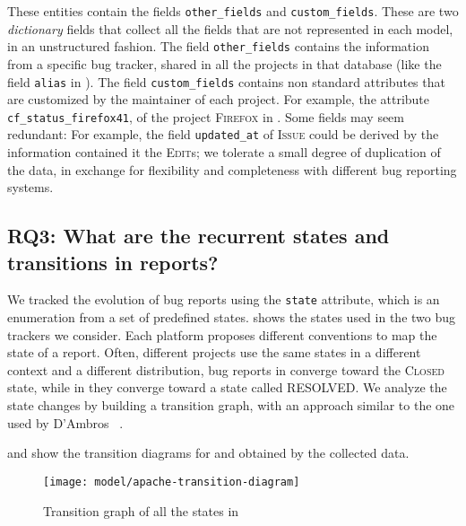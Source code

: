 These entities contain the fields \texttt{other\_fields} and \texttt{custom\_fields}.
These are two \emph{dictionary} fields that collect all the fields that are not represented in each model, in an unstructured fashion.
The field \texttt{other\_fields} contains the information from a specific bug tracker, shared in all the projects in that database (like the field \texttt{alias} in \bzilla).
The field \texttt{custom\_fields} contains non standard attributes that are customized by the maintainer of each project.
For example, the attribute \texttt{cf\_status\_firefox41}, of the project \textsc{Firefox} in \bzilla.
Some fields may seem redundant: For example, the field \texttt{updated\_at} of \textsc{Issue} could be derived by the information contained it the \textsc{Edit}s; we tolerate a small degree of duplication of the data, in exchange for flexibility and completeness with different bug reporting systems.




\subsection*{RQ3: What are the recurrent states and transitions in reports?} \label{sec:model-approach-states}

We tracked the evolution of bug reports using the \texttt{state} attribute, which is an enumeration from a set of predefined states.
 shows the states used in the two bug trackers we consider.
Each platform proposes different conventions to map the state of a report.
Often, different projects use the same states in a different context and a different distribution, \eg bug reports in \jira converge toward the \textsc{Closed} state, while in \bzilla they converge toward a state called \textsc{RESOLVED}.
We analyze the state changes by building a transition graph, with an approach similar to the one used by D'Ambros \etal~\cite{DAmb2007b}.

 and  show the transition diagrams for \jira and \bzilla obtained by the collected data.

\begin{figure*}[!ht]
\centering
\texttt{[image: model/apache-transition-diagram]}
\caption{Transition graph of all the states in \jira}
\label{fig:apache_transitions}
\end{figure*}

